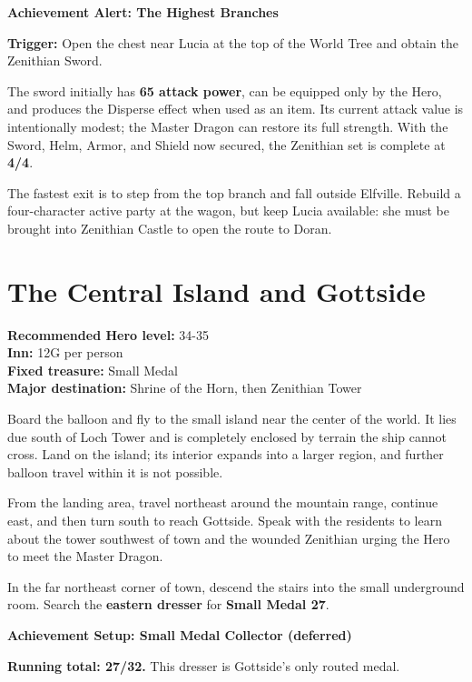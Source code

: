 \documentclass[
  american,
  10pt,
  letterpaper,
  oneside,
  open=any]{scrreprt}
\begin{document}
\begin{achievementalert}

\textbf{Achievement Alert: The Highest Branches}

\textbf{Trigger:} Open the chest near Lucia at the top of the World Tree
and obtain the Zenithian Sword.

\end{achievementalert}

The sword initially has \textbf{65 attack power}, can be equipped only
by the Hero, and produces the Disperse effect when used as an item. Its
current attack value is intentionally modest; the Master Dragon can
restore its full strength. With the Sword, Helm, Armor, and Shield now
secured, the Zenithian set is complete at \textbf{4/4}.

The fastest exit is to step from the top branch and fall outside
Elfville. Rebuild a four-character active party at the wagon, but keep
Lucia available: she must be brought into Zenithian Castle to open the
route to Doran.

\section{The Central Island and
Gottside}\label{the-central-island-and-gottside}

\textbf{Recommended Hero level:} 34-35\\
\textbf{Inn:} 12G per person\\
\textbf{Fixed treasure:} Small Medal\\
\textbf{Major destination:} Shrine of the Horn, then Zenithian Tower

Board the balloon and fly to the small island near the center of the
world. It lies due south of Loch Tower and is completely enclosed by
terrain the ship cannot cross. Land on the island; its interior expands
into a larger region, and further balloon travel within it is not
possible.

From the landing area, travel northeast around the mountain range,
continue east, and then turn south to reach Gottside. Speak with the
residents to learn about the tower southwest of town and the wounded
Zenithian urging the Hero to meet the Master Dragon.

In the far northeast corner of town, descend the stairs into the small
underground room. Search the \textbf{eastern dresser} for \textbf{Small
Medal 27}.

\begin{achievementsetup}

\textbf{Achievement Setup: Small Medal Collector (deferred)}

\textbf{Running total: 27/32.} This dresser is Gottside's only routed
medal.

\end{achievementsetup}
\end{document}
